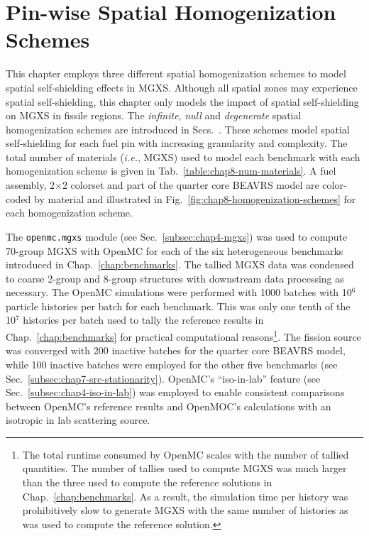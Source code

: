 \section{Pin-wise Spatial Homogenization Schemes}
\label{sec:chap8-pinwise-space-homogenize}

This chapter employs three different spatial homogenization schemes to model spatial self-shielding effects in \ac{MGXS}. Although all spatial zones may experience spatial self-shielding, this chapter only models the impact of spatial self-shielding on \ac{MGXS} in fissile regions. The \textit{infinite}, \textit{null} and \textit{degenerate} spatial homogenization schemes are introduced in Secs.~. These schemes model spatial self-shielding for each fuel pin with increasing granularity and complexity. The total number of materials (\textit{i.e.}, \ac{MGXS}) used to model each benchmark with each homogenization scheme is given in Tab.~\ref{table:chap8-num-materials}. A fuel assembly, 2$\times$2 colorset and part of the quarter core \ac{BEAVRS} model are color-coded by material and illustrated in Fig.~\ref{fig:chap8-homogenization-schemes} for each homogenization scheme.

The \texttt{openmc.mgxs} module (see Sec.~\ref{subsec:chap4-mgxs}) was used to compute 70-group \ac{MGXS} with OpenMC for each of the six heterogeneous benchmarks introduced in Chap.~\ref{chap:benchmarks}. The tallied \ac{MGXS} data was condensed to coarse 2-group and 8-group structures with downstream data processing as necessary. The OpenMC simulations were performed with 1000 batches with 10$^{6}$ particle histories per batch for each benchmark. This was only one tenth of the 10$^7$ histories per batch used to tally the reference results in Chap.~\ref{chap:benchmarks} for practical computational reasons\footnote{The total runtime consumed by OpenMC scales with the number of tallied quantities. The number of tallies used to compute \ac{MGXS} was much larger than the three used to compute the reference solutions in Chap.~\ref{chap:benchmarks}. As a result, the simulation time per history was prohibitively slow to generate \ac{MGXS} with the same number of histories as was used to compute the reference solution.}. The fission source was converged with 200 inactive batches for the quarter core \ac{BEAVRS} model, while 100 inactive batches were employed for the other five benchmarks (see Sec.~\ref{subsec:chap7-src-stationarity}). OpenMC's ``iso-in-lab'' feature (see Sec.~\ref{subsec:chap4-iso-in-lab}) was employed to enable consistent comparisons between OpenMC's reference results and OpenMOC's calculations with an isotropic in lab scattering source.

